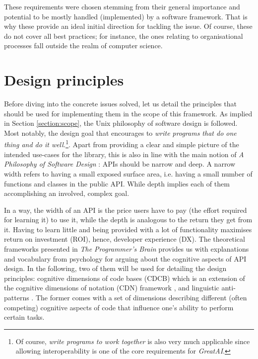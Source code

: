 These requirements were chosen stemming from their general importance and potential to be mostly handled (implemented) by a software framework. That is why these provide an ideal initial direction for tackling the issue. Of course, these do not cover all best practices; for instance, the ones relating to organisational processes fall outside the realm of computer science.

\section{Design principles}

Before diving into the concrete issues solved, let us detail the principles that should be used for implementing them in the scope of this framework. As implied in Section \ref{section:scope}, the Unix philosophy \cite{ritchie1978unix,salus1994quarter} of software design is followed. Most notably, the design goal that encourages to \textit{write programs that do one thing and do it well.}\footnote{Of course, \textit{write programs to work together} is also very much applicable since allowing interoperability is one of the core requirements for \textit{GreatAI}.}. Apart from providing a clear and simple picture of the intended use-cases for the library, this is also in line with the main notion of \textit{A Philosophy of Software Design} \cite{ousterhout2018philosophy}: APIs should be narrow and deep. A narrow width refers to having a small exposed surface area, i.e. having a small number of functions and classes in the public API. While depth implies each of them accomplishing an involved, complex goal. 

In a way, the width of an API is the price users have to pay (the effort required for learning it) to use it, while the depth is analogous to the return they get from it. Having to learn little and being provided with a lot of functionality maximises return on investment (ROI), hence, developer experience (DX). The theoretical frameworks presented in \textit{The Programmer's Brain} \cite{hermans2021programmer} provides us with explanations and vocabulary from psychology for arguing about the cognitive aspects of API design. In the following, two of them will be used for detailing the design principles: cognitive dimensions of code bases (CDCB) which is an extension of the cognitive dimensions of notation (CDN) framework \cite{blackwell2001cognitive}, and linguistic anti-patterns \cite{arnaoudova2016linguistic}. The former comes with a set of dimensions describing different (often competing) cognitive aspects of code that influence one's ability to perform certain tasks.

